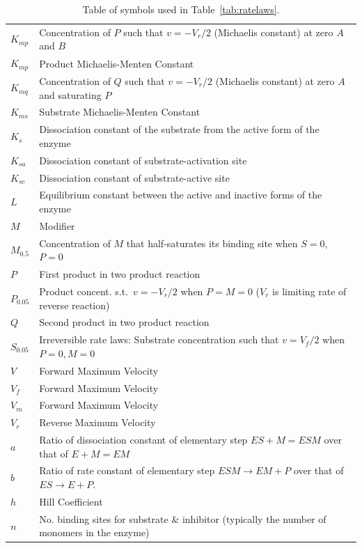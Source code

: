 \documentclass[10pt]{cekarticle}
\begin{document}
\begin{table}[ht]
\begin{tabular}{lp{5.5in}}
    $K_{mp}$	& Concentration of $P$ such that $v = -V_r/2$  (Michaelis constant) at zero $A$ and $B$ \\
    $K_{mp}$	& Product Michaelis-Menten Constant \\
    $K_{mq}$	& Concentration of $Q$ such that $v = -V_r/2$  (Michaelis constant) at zero $A$ and saturating $P$ \\
    $K_{ms}$	& Substrate Michaelis-Menten Constant \\
    $K_s$	& Dissociation constant of the substrate from the active form of the enzyme \\
    $K_{sa}$	& Dissociation constant of substrate-activation site \\
    $K_{sc}$	& Dissociation constant of substrate-active site \\
    $L$		& Equilibrium constant between the active and inactive forms of the enzyme \\
    $M$		& Modifier \\
    $M_{0.5}$	& Concentration of $M$ that half-saturates its binding site when $S = 0$, $P=0$ \\
    $P$		& First product in two product reaction \\
    $P_{0.05}$	& Product concent. s.t.\ $v = - V_r/2$ when $P = M = 0$ ($V_r$ is limiting rate of reverse reaction) \\
    $Q$		& Second product in two product reaction \\
    $S_{0.05}$	& Irreversible rate laws: Substrate concentration such that $v = V_f/2$ when $P = 0, M=0$ \\
    $V$		& Forward Maximum Velocity \\
    $V_f$	& Forward Maximum Velocity \\
    $V_m$	& Forward Maximum Velocity \\
    $V_r$	& Reverse Maximum Velocity \\
    $a$		& Ratio of dissociation constant of elementary step $ES + M = ESM$ over that of $E + M = EM$ \\
    $b$		& Ratio of rate constant of elementary step $ESM \to EM + P$ over that of $ES \to E + P$. \\
    $h$		& Hill Coefficient \\
    $n$		& No. binding sites for substrate \& inhibitor (typically the number of monomers in the enzyme) \\
    \bottomrule
  \end{tabular}
  \caption{Table of symbols used in Table~\ref{tab:ratelaws}.}
\end{table}




\clearpage





\end{document}
